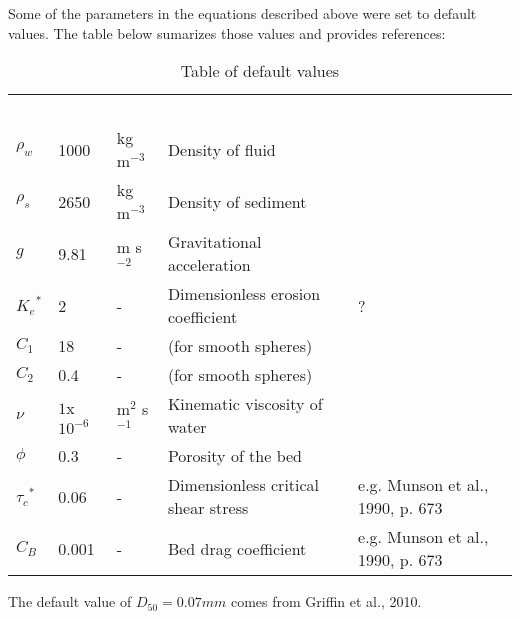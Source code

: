 \documentclass[11pt]{article}
\begin{document}
Some of the parameters in the equations described above were set to default values. The table below sumarizes those values and provides references:

\begin{table}[]
\centering
\caption{Table of default values}
\begin{tabular}{|l|l|l|l|l|}
\ \\ \cline{1-5}
$\rho_w$ & 1000 & kg m$^{-3}$ & Density of fluid           &  \\ \cline{1-5}
$\rho_s$ & 2650 & kg m$^{-3}$ & Density of sediment        &  \\ \cline{1-5}
$g$      & 9.81 & m s$^{-2}$  & Gravitational acceleration &  \\ \cline{1-5}
${K_e}^*$         &   2   & - & Dimensionless erosion coefficient &  ?\\ \cline{1-5}
$C_1$         &  18    &       -      & (for smooth spheres)                           & \citep{ferguson2004simple} \\ \cline{1-5}
$C_2$         &    0.4  &       -      & (for smooth spheres)                            & \citep{ferguson2004simple} \\ \cline{1-5}
$\nu$         &  $1$x${10}^{-6}$    &   m$^2$ s$^{-1}$          &   Kinematic viscosity of water                         &  \\ \cline{1-5}
$\phi$         &   0.3   &     -        & Porosity of the bed  & &\\ \cline{1-5}
${\tau_c}^*$         &   0.06   &     -        & Dimensionless critical shear stress     & e.g. Munson et al., 1990, p. 673 &\\ \cline{1-5}
$C_B$         &   0.001   &     -        & Bed drag coefficient                           & e.g. Munson et al., 1990, p. 673 &\\ \cline{1-5}
\end{tabular}
\end{table}

The default value of $D_{50} = 0.07 mm$ comes from Griffin et al., 2010.
\end{document}
